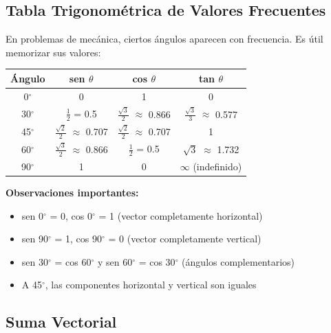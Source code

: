 \subsection{Tabla Trigonométrica de Valores Frecuentes}

\begin{seccion}
En problemas de mecánica, ciertos ángulos aparecen con frecuencia. Es útil memorizar sus valores:

\vspace{0.5cm}

\begin{center}
\begin{tabular}{|c|c|c|c|}
\hline
\rowcolor{azulmedio!30}
\textbf{Ángulo} & \textbf{sen $\theta$} & \textbf{cos $\theta$} & \textbf{tan $\theta$} \\
\hline
0$^\circ$ & 0 & 1 & 0 \\
\hline
30$^\circ$ & $\frac{1}{2}$ = 0.5 & $\frac{\sqrt{3}}{2}$ $\approx$ 0.866 & $\frac{\sqrt{3}}{3}$ $\approx$ 0.577 \\
\hline
45$^\circ$ & $\frac{\sqrt{2}}{2}$ $\approx$ 0.707 & $\frac{\sqrt{2}}{2}$ $\approx$ 0.707 & 1 \\
\hline
60$^\circ$ & $\frac{\sqrt{3}}{2}$ $\approx$ 0.866 & $\frac{1}{2}$ = 0.5 & $\sqrt{3}$ $\approx$ 1.732 \\
\hline
90$^\circ$ & 1 & 0 & $\infty$ (indefinido) \\
\hline
\end{tabular}
\end{center}

\vspace{0.3cm}

\textbf{Observaciones importantes:}
\begin{itemize}
    \item sen 0$^\circ$ = 0, cos 0$^\circ$ = 1 (vector completamente horizontal)
    \item sen 90$^\circ$ = 1, cos 90$^\circ$ = 0 (vector completamente vertical)
    \item sen 30$^\circ$ = cos 60$^\circ$ y sen 60$^\circ$ = cos 30$^\circ$ (ángulos complementarios)
    \item A 45$^\circ$, las componentes horizontal y vertical son iguales
\end{itemize}
\end{seccion}
\newpage

\subsection{Suma Vectorial}

